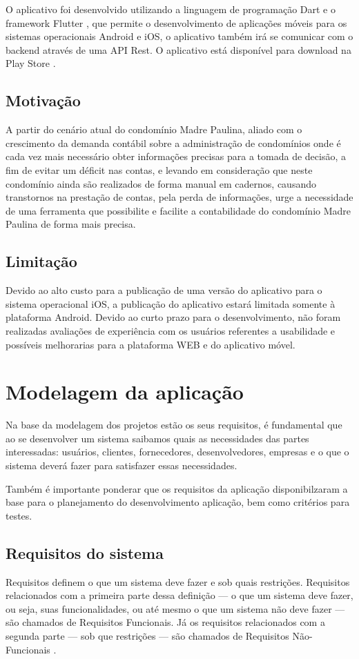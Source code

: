\documentclass[12pt]{article}
\begin{document}
O aplicativo foi desenvolvido utilizando a linguagem de programação Dart \cite{dart} e o framework Flutter \cite{flutter}, que permite o desenvolvimento de aplicações móveis para os sistemas operacionais Android e iOS, o aplicativo também irá se comunicar com o backend através de uma API Rest. O aplicativo está disponível para download na Play Store \cite{appMadrePaulina}.

\subsection{Motivação}
A partir do cenário atual do condomínio Madre Paulina, aliado com o crescimento da demanda contábil sobre a administração de condomínios onde é cada vez mais necessário obter informações precisas para a tomada de decisão, a fim de evitar um déficit nas contas, e levando em consideração que neste condomínio ainda são realizados de forma manual em cadernos, causando transtornos na prestação de contas, pela perda de informações, urge a necessidade de uma ferramenta que possibilite e facilite a contabilidade do condomínio Madre Paulina de forma mais precisa.

\subsection{Limitação}
Devido ao alto custo para a publicação de uma versão do aplicativo para o sistema operacional iOS, a publicação do aplicativo estará limitada somente à plataforma Android.
Devido ao curto prazo para o desenvolvimento, não foram realizadas avaliações de experiência com os usuários referentes a usabilidade e possíveis melhorarias para a plataforma WEB e do aplicativo móvel.

\section{Modelagem da aplicação}
Na base da modelagem dos projetos estão os seus requisitos, é fundamental que ao se desenvolver um sistema saibamos quais as necessidades das partes interessadas: usuários, clientes, fornecedores, desenvolvedores, empresas e o que o sistema deverá fazer para satisfazer essas necessidades.

Também é importante ponderar que os requisitos da aplicação disponibilzaram a base para o planejamento do desenvolvimento aplicação, bem como critérios para testes.

\subsection{Requisitos do sistema}
Requisitos definem o que um sistema deve fazer e sob quais restrições. Requisitos relacionados com a primeira parte dessa definição — o que um sistema deve fazer, ou seja, suas funcionalidades, ou até mesmo o que um sistema não deve fazer — são chamados de Requisitos Funcionais. Já os requisitos relacionados com a segunda parte — sob que restrições — são chamados de Requisitos Não-Funcionais \cite[Capítulo 3.1]{engsoftware}.
\end{document}
